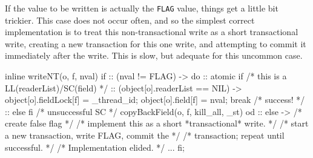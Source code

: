 \documentclass{csa-sig-alternate}
\newenvironment{inlinecode}%
  {\par\linespread{0.9}\footnotesize\samepage%
\verbatim}%
  {\endverbatim}
\newcommand{\FLAG}{\texttt{FLAG}\xspace}
\begin{document}
If the value to be written is actually the \FLAG value, things get a
little bit trickier.  This case does not occur often, and so the
simplest correct implementation is to treat this non-transactional
write as a short transactional write, creating a new transaction for
this one write, and attempting to commit it immediately after the
write.  This is slow, but adequate for this uncommon case.
\begin{inlinecode}
inline writeNT(o, f, nval) {
  if
  :: (nval != FLAG) ->
     do
     :: atomic {
          if /* this is a LL(readerList)/SC(field) */
          :: (object[o].readerList == NIL) ->
             object[o].fieldLock[f] = _thread_id;
             object[o].field[f] = nval;
             break /* success! */
          :: else
          fi
        }
        /* unsuccessful SC */
        copyBackField(o, f, kill_all, _st)
     od
  :: else -> /* create false flag */
     /* implement this as a short *transactional* write. */
     /* start a new transaction, write FLAG, commit the */
     /* transaction; repeat until successful. */
     /* Implementation elided. */
     ...
  fi;
}
\end{inlinecode}
\end{document}

